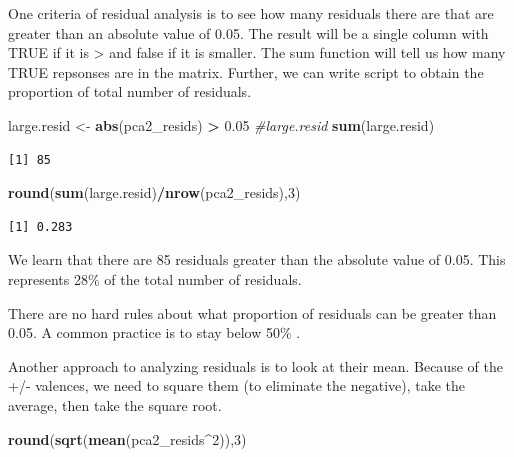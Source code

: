 \documentclass[
  english,
]{book}
\newenvironment{Shaded}{\begin{snugshade}}{\end{snugshade}}
\newcommand{\CommentTok}[1]{\textcolor[rgb]{0.56,0.35,0.01}{\textit{#1}}}
\newcommand{\DecValTok}[1]{\textcolor[rgb]{0.00,0.00,0.81}{#1}}
\newcommand{\FloatTok}[1]{\textcolor[rgb]{0.00,0.00,0.81}{#1}}
\newcommand{\KeywordTok}[1]{\textcolor[rgb]{0.13,0.29,0.53}{\textbf{#1}}}
\newcommand{\NormalTok}[1]{#1}
\newcommand{\OperatorTok}[1]{\textcolor[rgb]{0.81,0.36,0.00}{\textbf{#1}}}
\newcommand{\StringTok}[1]{\textcolor[rgb]{0.31,0.60,0.02}{#1}}
\begin{document}
One criteria of residual analysis is to see how many residuals there are that are greater than an absolute value of 0.05. The result will be a single column with TRUE if it is \textgreater{} \textbar{} and false if it is smaller. The sum function will tell us how many TRUE repsonses are in the matrix. Further, we can write script to obtain the proportion of total number of residuals.

\begin{Shaded}
\begin{Highlighting}[]
\NormalTok{large.resid <-}\StringTok{ }\KeywordTok{abs}\NormalTok{(pca2_resids) }\OperatorTok{>}\StringTok{ }\FloatTok{0.05}
\CommentTok{#large.resid}
\KeywordTok{sum}\NormalTok{(large.resid)}
\end{Highlighting}
\end{Shaded}

\begin{verbatim}
[1] 85
\end{verbatim}

\begin{Shaded}
\begin{Highlighting}[]
\KeywordTok{round}\NormalTok{(}\KeywordTok{sum}\NormalTok{(large.resid)}\OperatorTok{/}\KeywordTok{nrow}\NormalTok{(pca2_resids),}\DecValTok{3}\NormalTok{)}
\end{Highlighting}
\end{Shaded}

\begin{verbatim}
[1] 0.283
\end{verbatim}

We learn that there are 85 residuals greater than the absolute value of 0.05. This represents 28\% of the total number of residuals.

There are no hard rules about what proportion of residuals can be greater than 0.05. A common practice is to stay below 50\% \citep{field_discovering_2012}.

Another approach to analyzing residuals is to look at their mean. Because of the +/- valences, we need to square them (to eliminate the negative), take the average, then take the square root.

\begin{Shaded}
\begin{Highlighting}[]
\KeywordTok{round}\NormalTok{(}\KeywordTok{sqrt}\NormalTok{(}\KeywordTok{mean}\NormalTok{(pca2_resids}\OperatorTok{^}\DecValTok{2}\NormalTok{)),}\DecValTok{3}\NormalTok{)}
\end{Highlighting}
\end{Shaded}
\end{document}
